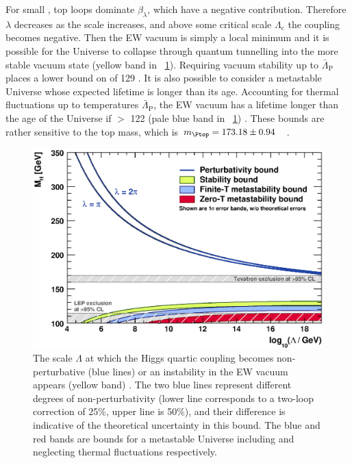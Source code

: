 For small \mH, top loops dominate $\beta_{\lambda}$, which have a negative 
contribution. Therefore $\lambda$ decreases as the scale increases, and above some 
critical scale $\Lambda_{\text{c}}$ the coupling becomes negative. Then the EW 
vacuum is simply a local minimum and it is possible for the Universe to collapse through
quantum tunnelling into the more stable vacuum state (yellow band in 
\Figure~\ref{fig:theory_constraints}). Requiring vacuum stability up to 
$\bar{\Lambda}_{\text{P}}$ places a lower bound on \mH of \unit{129}{\GeV} 
\cite{Ellis:2009}. 
It is also possible to consider a metastable Universe whose expected lifetime is longer 
than its age. Accounting for thermal fluctuations up to temperatures 
\about$\bar{\Lambda}_{\text{P}}$, the EW vacuum has a lifetime longer than the age 
of the Universe if \mH $>$ \unit{122}{\GeV} (pale blue band in 
\Figure~\ref{fig:theory_constraints}) \cite{Ellis:2009}. These bounds are rather 
sensitive to the top mass, which is 
\unit{$m_{\Ptop} = 173.18 \pm 0.94$}{\GeV} \cite{TopMass}.

\begin{figure}[t]
	\includegraphics[width=\mediumfigwidth]{tex/motivation/theory_constraints}
	\caption{The scale $\Lambda$ at which the Higgs quartic coupling becomes 
	non-perturbative (blue lines) or an instability in the EW vacuum appears
	(yellow band) \cite{Ellis:2009}. The two blue lines represent different degrees of 
	non-perturbativity (lower line corresponds to a two-loop correction of 25\%, upper 
	line is 50\%), and their difference is indicative of the theoretical uncertainty in 
	this bound. The blue and red bands are bounds for a metastable Universe including and
	neglecting thermal fluctuations respectively.}
	\label{fig:theory_constraints}
\end{figure}
